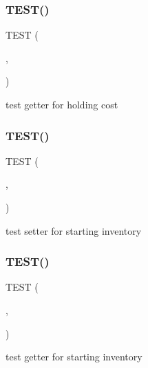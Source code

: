 \subsubsection{\texorpdfstring{T\+E\+S\+T()}{TEST()}\hspace{0.1cm}{\footnotesize\ttfamily [25/54]}}
{\footnotesize\ttfamily T\+E\+ST (\begin{DoxyParamCaption}\item[{game\+Test}]{,  }\item[{get\+Holding\+Cost\+Test}]{ }\end{DoxyParamCaption})}

test getter for holding cost \mbox{\label{group__group2_ga627c817aed1301edefb40baa79ddad22}} 
\subsubsection{\texorpdfstring{T\+E\+S\+T()}{TEST()}\hspace{0.1cm}{\footnotesize\ttfamily [26/54]}}
{\footnotesize\ttfamily T\+E\+ST (\begin{DoxyParamCaption}\item[{game\+Test}]{,  }\item[{set\+Starting\+Inventory\+Test}]{ }\end{DoxyParamCaption})}

test setter for starting inventory \mbox{\label{group__group2_ga9ab56c8f5688c460d082f6f21ab0e3c8}} 
\subsubsection{\texorpdfstring{T\+E\+S\+T()}{TEST()}\hspace{0.1cm}{\footnotesize\ttfamily [27/54]}}
{\footnotesize\ttfamily T\+E\+ST (\begin{DoxyParamCaption}\item[{game\+Test}]{,  }\item[{get\+Starting\+Inventory\+Test}]{ }\end{DoxyParamCaption})}

test getter for starting inventory \mbox{\label{group__group2_gab35ea165c84a93ac51e15da73e5f55c0}} 
